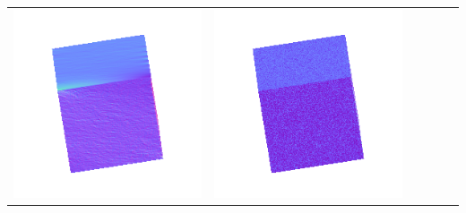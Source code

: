 \begin{center}
\begin{tabularx}{\linewidth}{@{}Y@{}Y@{}Y@{}Y@{}Y@{}Y@{}}
\includegraphics[width=\linewidth]{semisynthetic/20160617_0_yu_out.png} &
\includegraphics[width=\linewidth]{semisynthetic/20160617_0_dpsn_out.png} &

\end{tabularx}
\end{center}
